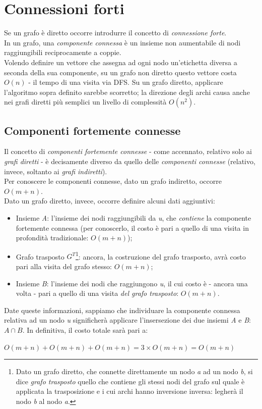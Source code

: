 \section{Connessioni forti}
Se un grafo è diretto occorre introdurre il concetto di \textit{connessione forte}. \\
In un grafo, una \textit{componente connessa} è un insieme non aumentabile di nodi raggiungibili reciprocamente a coppie. \\
Volendo definire un vettore che assegna ad ogni nodo un'etichetta diversa a seconda della sua componente, su un grafo non diretto questo vettore costa $ O(n) $ - il tempo di una visita via DFS.
Su un grafo diretto, applicare l'algoritmo sopra definito sarebbe scorretto; la direzione degli archi causa anche nei grafi diretti più semplici un livello di complessità $ O(n^2) $.


\subsection{Componenti fortemente connesse}
Il concetto di \textit{componenti fortemente connesse} - come accennato, relativo solo ai \textit{grafi diretti} - è decisamente diverso da quello delle \textit{componenti connesse} (relativo, invece, soltanto ai \textit{grafi indiretti}). \\
Per conoscere le componenti connesse, dato un grafo indiretto, occorre $ O(m+n)$. \\
Dato un grafo diretto, invece, occorre definire alcuni dati aggiuntivi:
\begin{itemize}
    \item Insieme \textit{A}: l'insieme dei nodi raggiungibili da \textit{u}, che \textit{contiene} la componente fortemente connessa (per conoscerlo, il costo è pari a quello di una visita in profondità tradizionale: $O(m+n)$);
    \item Grafo trasposto $G^T$\footnote{Dato un grafo diretto, che connette direttamente un nodo \textit{a} ad un nodo \textit{b}, si dice \textit{grafo trasposto} quello che contiene gli stessi nodi del grafo sul quale è applicata la trasposizione e i cui archi hanno inversione inversa: legherà il nodo \textit{b} al nodo \textit{a}.}: ancora, la costruzione del grafo trasposto, avrà costo pari alla visita del grafo stesso: $O(m+n)$;
    \item Insieme \textit{B}: l'insieme dei nodi che raggiungono \textit{u}, il cui costo è - ancora una volta - pari a quello di una visita \textit{del grafo trasposto}: $O(m+n)$.
\end{itemize}
Date queste informazioni, sappiamo che individuare la componente connessa relativa ad un nodo \textit{u} significherà applicare l'insersezione dei due insiemi \textit{A} e \textit{B}: $A\cap B$.
In definitiva, il costo totale sarà pari a:
\begin{center}
    $ O(m+n) + O(m+n) + O(m+n) = 3\times O(m+n) = O(m+n) $
\end{center}
